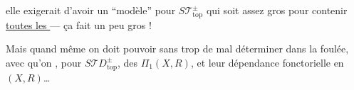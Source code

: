 elle exigerait d'avoir un ``modèle'' pour $S\mathcal T_{\mathrm{top}}^\pm$ qui soit assez gros pour contenir  \uline{toutes les } --- ça fait un peu gros !

Mais quand même on doit pouvoir sans trop de mal déterminer dans la foulée, avec  qu'on , pour $S\mathcal TD_{\mathrm{top}}^\pm$, des  $\Pi_1(X,R)$, et leur dépendance fonctorielle en $(X,R)$\ldots
{}
